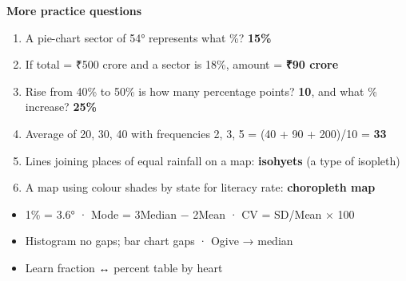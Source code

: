 \textbf{More practice questions}

\begin{enumerate}
\def\labelenumi{\arabic{enumi}.}
\setcounter{enumi}{15}
\tightlist
\item
  A pie-chart sector of 54° represents what \%? \textbf{15\%}
\item
  If total = ₹500 crore and a sector is 18\%, amount = \textbf{₹90 crore}
\item
  Rise from 40\% to 50\% is how many percentage points? \textbf{10}, and what \% increase? \textbf{25\%}
\item
  Average of 20, 30, 40 with frequencies 2, 3, 5 = (40 + 90 + 200)/10 = \textbf{33}
\item
  Lines joining places of equal rainfall on a map: \textbf{isohyets} (a type of isopleth)
\item
  A map using colour shades by state for literacy rate: \textbf{choropleth map}
\end{enumerate}

\begin{revbox}

\begin{itemize}
\tightlist
\item
  1\% = 3.6° · Mode = 3Median − 2Mean · CV = SD/Mean × 100
\item
  Histogram no gaps; bar chart gaps · Ogive → median
\item
  Learn fraction ↔ percent table by heart
\end{itemize}

\end{revbox}
